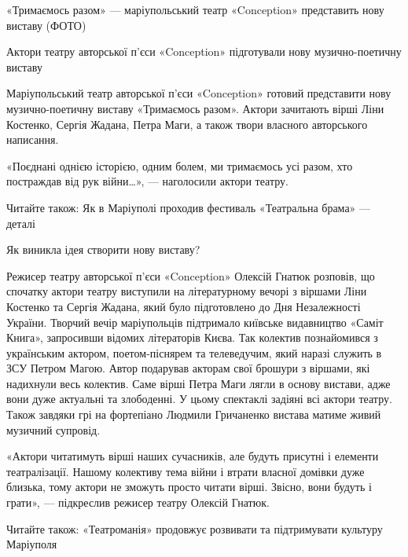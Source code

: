  
 
 
 
 

«Тримаємось разом» — маріупольський театр «Conception» представить нову виставу (ФОТО)

Актори театру авторської п'єси «Conception» підготували нову музично-поетичну виставу

Маріупольський театр авторської п'єси «Conception» готовий представити нову
музично-поетичну виставу «Тримаємось разом». Актори зачитають вірші Ліни
Костенко, Сергія Жадана, Петра Маги, а також твори власного авторського
написання.

«Поєднані однією історією, одним болем, ми тримаємось усі разом, хто постраждав
від рук війни…», — наголосили актори театру.

Читайте також: Як в Маріуполі проходив фестиваль «Театральна брама» — деталі

Як виникла ідея створити нову виставу? 

Режисер театру авторської п'єси «Conception» Олексій Гнатюк розповів, що
спочатку актори театру виступили на літературному вечорі з віршами Ліни
Костенко та Сергія Жадана, який було підготовлено до Дня Незалежності України.
Творчий вечір маріупольців підтримало київське видавництво «Саміт Книга»,
запросивши відомих літераторів Києва. Так колектив познайомився з українським
актором, поетом-піснярем та телеведучим, який наразі служить в ЗСУ Петром
Магою. Автор подарував акторам свої брошури з віршами, які надихнули весь
колектив. Саме вірші Петра Маги лягли в основу вистави, адже вони дуже
актуальні та злободенні. У цьому спектаклі задіяні всі актори театру. Також
завдяки грі на фортепіано Людмили Гричаненко вистава матиме живий музичний
супровід.

«Актори читатимуть вірші наших сучасників, але будуть присутні і елементи
театралізації. Нашому колективу тема війни і втрати власної домівки дуже
близька, тому актори не зможуть просто читати вірші. Звісно, вони будуть і
грати», — підкреслив режисер театру Олексій Гнатюк.

Читайте також: «Театроманія» продовжує розвивати та підтримувати культуру
Маріуполя

